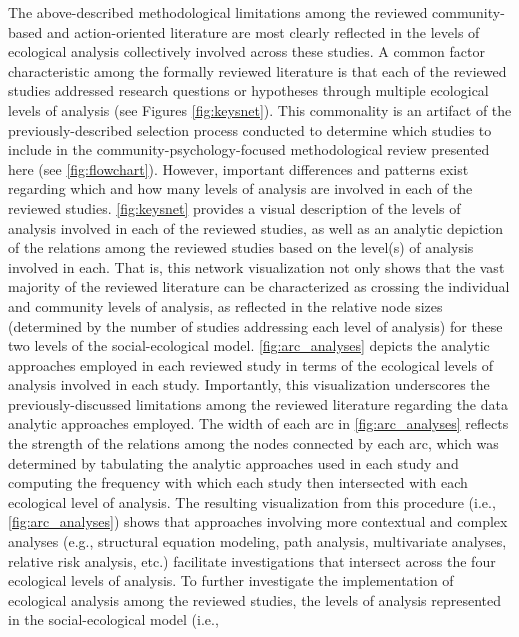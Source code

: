 \documentclass[11pt,]{tufte-book}
\begin{document}
The above-described methodological limitations among the reviewed
community-based and action-oriented literature are most clearly
reflected in the levels of ecological analysis collectively involved
across these studies. A common factor characteristic among the formally
reviewed literature is that each of the reviewed studies addressed
research questions or hypotheses through multiple ecological levels of
analysis (see Figures \ref{fig:keysnet}). This commonality is an
artifact of the previously-described selection process conducted to
determine which studies to include in the community-psychology-focused
methodological review presented here (see
\cref{fig:flowchart}). However, important differences
and patterns exist regarding which and how many levels of analysis are
involved in each of the reviewed studies.
\cref{fig:keysnet} provides a visual description of the
levels of analysis involved in each of the reviewed studies, as well as
an analytic depiction of the relations among the reviewed studies based
on the level(s) of analysis involved in each. That is, this network
visualization not only shows that the vast majority of the reviewed
literature can be characterized as crossing the individual and community
levels of analysis, as reflected in the relative node sizes (determined
by the number of studies addressing each level of analysis) for these
two levels of the social-ecological model.
\cref{fig:arc_analyses} depicts the analytic approaches
employed in each reviewed study in terms of the ecological levels of
analysis involved in each study. Importantly, this visualization
underscores the previously-discussed limitations among the reviewed
literature regarding the data analytic approaches employed. The width of
each arc in \cref{fig:arc_analyses} reflects the
strength of the relations among the nodes connected by each arc, which
was determined by tabulating the analytic approaches used in each study
and computing the frequency with which each study then intersected with
each ecological level of analysis. The resulting visualization from this
procedure (i.e., \cref{fig:arc_analyses}) shows that
approaches involving more contextual and complex analyses (e.g.,
structural equation modeling, path analysis, multivariate analyses,
relative risk analysis, etc.) facilitate investigations that intersect
across the four ecological levels of analysis. To further investigate
the implementation of ecological analysis among the reviewed studies,
the levels of analysis represented in the social-ecological model (i.e.,
\end{document}

